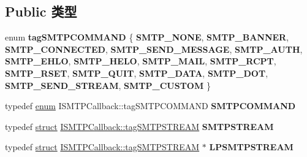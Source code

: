 \subsection*{Public 类型}
\begin{DoxyCompactItemize}
\item 
\mbox{\label{interface_i_s_m_t_p_callback_a634bd7106923db908433c8f18a55efcd}} 
enum {\bfseries tag\+S\+M\+T\+P\+C\+O\+M\+M\+A\+ND} \{ \newline
{\bfseries S\+M\+T\+P\+\_\+\+N\+O\+NE}, 
{\bfseries S\+M\+T\+P\+\_\+\+B\+A\+N\+N\+ER}, 
{\bfseries S\+M\+T\+P\+\_\+\+C\+O\+N\+N\+E\+C\+T\+ED}, 
{\bfseries S\+M\+T\+P\+\_\+\+S\+E\+N\+D\+\_\+\+M\+E\+S\+S\+A\+GE}, 
\newline
{\bfseries S\+M\+T\+P\+\_\+\+A\+U\+TH}, 
{\bfseries S\+M\+T\+P\+\_\+\+E\+H\+LO}, 
{\bfseries S\+M\+T\+P\+\_\+\+H\+E\+LO}, 
{\bfseries S\+M\+T\+P\+\_\+\+M\+A\+IL}, 
\newline
{\bfseries S\+M\+T\+P\+\_\+\+R\+C\+PT}, 
{\bfseries S\+M\+T\+P\+\_\+\+R\+S\+ET}, 
{\bfseries S\+M\+T\+P\+\_\+\+Q\+U\+IT}, 
{\bfseries S\+M\+T\+P\+\_\+\+D\+A\+TA}, 
\newline
{\bfseries S\+M\+T\+P\+\_\+\+D\+OT}, 
{\bfseries S\+M\+T\+P\+\_\+\+S\+E\+N\+D\+\_\+\+S\+T\+R\+E\+AM}, 
{\bfseries S\+M\+T\+P\+\_\+\+C\+U\+S\+T\+OM}
 \}
\item 
\mbox{\label{interface_i_s_m_t_p_callback_aa5a2bb5527b706bdd0c2bd2f63ab20b8}} 
typedef \hyperlink{interfaceenum}{enum} I\+S\+M\+T\+P\+Callback\+::tag\+S\+M\+T\+P\+C\+O\+M\+M\+A\+ND {\bfseries S\+M\+T\+P\+C\+O\+M\+M\+A\+ND}
\item 
\mbox{\label{interface_i_s_m_t_p_callback_a08fe6d3026837e42a910a0ee4d9df9ee}} 
typedef \hyperlink{interfacestruct}{struct} \hyperlink{struct_i_s_m_t_p_callback_1_1tag_s_m_t_p_s_t_r_e_a_m}{I\+S\+M\+T\+P\+Callback\+::tag\+S\+M\+T\+P\+S\+T\+R\+E\+AM} {\bfseries S\+M\+T\+P\+S\+T\+R\+E\+AM}
\item 
\mbox{\label{interface_i_s_m_t_p_callback_a9a1dfe51c835c6996bcc51e7b5deb9cf}} 
typedef \hyperlink{interfacestruct}{struct} \hyperlink{struct_i_s_m_t_p_callback_1_1tag_s_m_t_p_s_t_r_e_a_m}{I\+S\+M\+T\+P\+Callback\+::tag\+S\+M\+T\+P\+S\+T\+R\+E\+AM} $\ast$ {\bfseries L\+P\+S\+M\+T\+P\+S\+T\+R\+E\+AM}
\item 

\end{DoxyCompactItemize}
